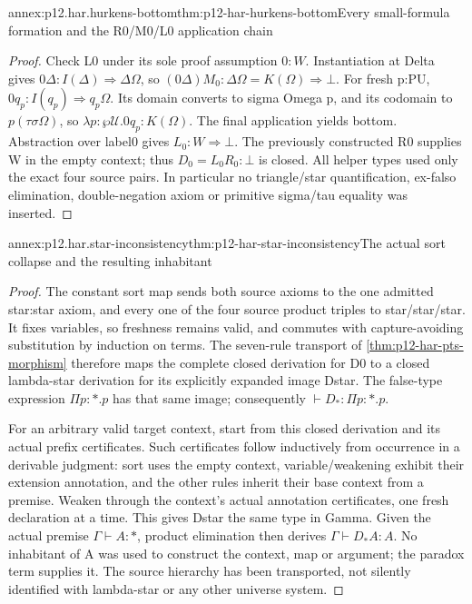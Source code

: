 \begin{annexitem}{annex:p12.har.hurkens-bottom}{thm:p12-har-hurkens-bottom}{Every small-formula formation and the R0/M0/L0 application chain}
\begin{proof}
Check L0 under its sole proof assumption \(0:W\).
Instantiation at Delta gives
\(0\Delta:I(\Delta)\Rightarrow\Delta\Omega\),
so \((0\Delta)M_0:\Delta\Omega=K(\Omega)\Rightarrow\bot\).
For fresh p:PU, \(0q_p:I(q_p)\Rightarrow q_p\Omega\).
Its domain converts to sigma Omega p, and its codomain to
\(p(\tau\sigma\Omega)\), so
\(\lambda p:\wp\mathcal U.0q_p:K(\Omega)\).
The final application yields bottom. Abstraction over label0 gives
\(L_0:W\Rightarrow\bot\). The previously constructed R0 supplies
W in the empty context; thus \(D_0=L_0R_0:\bot\) is closed.
All helper types used only the exact four source pairs. In particular
no triangle/star quantification, ex-falso elimination, double-negation
axiom or primitive sigma/tau equality was inserted.
\end{proof}
\end{annexitem}

\begin{annexitem}{annex:p12.har.star-inconsistency}{thm:p12-har-star-inconsistency}{The actual sort collapse and the resulting inhabitant}
\begin{proof}
The constant sort map sends both source axioms to the one admitted
star:star axiom, and every one of the four source product triples
to star/star/star. It fixes variables, so freshness remains valid,
and commutes with capture-avoiding substitution by induction on terms.
The seven-rule transport of \cref{thm:p12-har-pts-morphism} therefore
maps the complete closed derivation for D0 to a closed lambda-star
derivation for its explicitly expanded image Dstar. The false-type
expression \(\Pi p:\ast.p\) has that same image; consequently
\(\vdash D_\ast:\Pi p:\ast.p\).

For an arbitrary valid target context, start from this closed derivation
and its actual prefix certificates. Such certificates follow inductively
from occurrence in a derivable judgment: sort uses the empty context,
variable/weakening exhibit their extension annotation, and the other
rules inherit their base context from a premise.
Weaken through the context's actual annotation certificates, one
fresh declaration at a time. This gives Dstar the same type in Gamma.
Given the actual premise \(\Gamma\vdash A:\ast\), product
elimination then derives \(\Gamma\vdash D_\ast A:A\).
No inhabitant of A was used to construct the context, map or argument;
the paradox term supplies it. The source hierarchy has been transported,
not silently identified with lambda-star or any other universe system.
\end{proof}
\end{annexitem}

